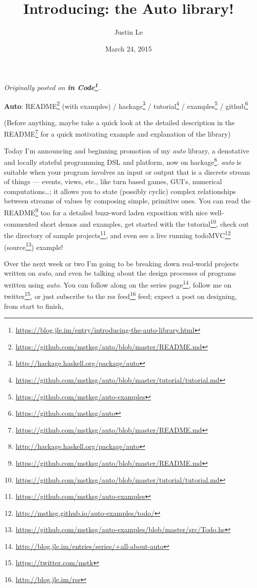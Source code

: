 \documentclass[]{article}
\title{Introducing: the Auto library!}
\author{Justin Le}
\date{March 24, 2015}
\renewcommand{\href}[2]{#2\footnote{\url{#1}}}
\begin{document}
\maketitle

\emph{Originally posted on
\textbf{\href{https://blog.jle.im/entry/introducing-the-auto-library.html}{in
Code}}.}

\textbf{Auto}:
\href{https://github.com/mstksg/auto/blob/master/README.md}{README}
(with examples) /
\href{http://hackage.haskell.org/package/auto}{hackage} /
\href{https://github.com/mstksg/auto/blob/master/tutorial/tutorial.md}{tutorial}
/ \href{https://github.com/mstksg/auto-examples}{examples} /
\href{https://github.com/mstksg/auto}{github}

(Before anything, maybe take a quick look at the detailed description in
the \href{https://github.com/mstksg/auto/blob/master/README.md}{README}
for a quick motivating example and explanation of the library)

Today I'm announcing and beginning promotion of my \emph{auto} library,
a denotative and locally stateful programming DSL and platform, now
\href{http://hackage.haskell.org/package/auto}{on hackage}. \emph{auto}
is suitable when your program involves an input or output that is a
discrete stream of things --- events, views, etc., like turn based
games, GUI's, numerical computations\ldots{}; it allows you to state
(possibly cyclic) complex relationships between streams of values by
composing simple, primitive ones. You can read the
\href{https://github.com/mstksg/auto/blob/master/README.md}{README} too
for a detailed buzz-word laden exposition with nice well-commented short
demos and examples, get started with
\href{https://github.com/mstksg/auto/blob/master/tutorial/tutorial.md}{the
tutorial}, check out the directory of
\href{https://github.com/mstksg/auto-examples}{sample projects}, and
even see a live running
\href{http://mstksg.github.io/auto-examples/todo/}{todoMVC}
(\href{https://github.com/mstksg/auto-examples/blob/master/src/Todo.hs}{source})
example!

Over the next week or two I'm going to be breaking down real-world
projects written on \emph{auto}, and even be talking about the design
processes of programs written using \emph{auto}. You can follow along on
\href{http://blog.jle.im/entries/series/+all-about-auto}{the series
page}, follow me on \href{https://twitter.com/mstk}{twitter}, or just
subscribe to the \href{http://blog.jle.im/rss}{rss feed} feed; expect a
post on designing, from start to finish,
\end{document}
